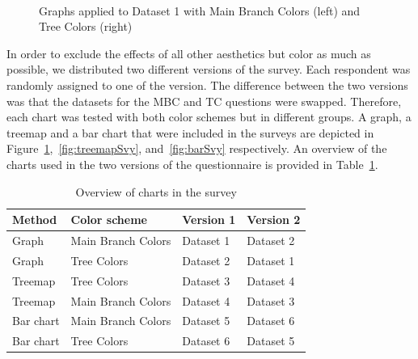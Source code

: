 \documentclass[journal]{vgtc}                %
\begin{document}
\begin{figure}[tb]
  \centering
  \mbox{
  }
  \caption{Graphs applied to Dataset 1 with Main Branch Colors (left) and Tree Colors (right)}\label{fig:graphSvy}

\end{figure}

In order to exclude the effects of all other aesthetics but color as much as possible, we distributed two different versions of the survey. Each respondent was randomly assigned to one of the version. The difference between the two versions was that the datasets for the MBC and TC questions were swapped. Therefore, each chart was tested with both color schemes but in different groups. A graph, a treemap and a bar chart that were included in the surveys are depicted in Figure~\ref{fig:graphSvy},~\ref{fig:treemapSvy}, and~\ref{fig:barSvy} respectively. An overview of the charts used in the two versions of the questionnaire is provided in Table~\ref{table:ques}.

\begin{table}[tb]
\begin{footnotesize}
\begin{tabular}{llll}
\toprule
Method & Color scheme & Version 1 & Version 2\\
\midrule
Graph & Main Branch Colors & Dataset 1 & Dataset 2\\
Graph & Tree Colors & Dataset 2 & Dataset 1\\
Treemap & Tree Colors & Dataset 3 & Dataset 4\\
Treemap & Main Branch Colors & Dataset 4 & Dataset 3\\
Bar chart & Main Branch Colors & Dataset 5 & Dataset 6\\
Bar chart & Tree Colors & Dataset 6 & Dataset 5\\
\bottomrule
\end{tabular}
\end{footnotesize}
\caption{Overview of charts in the survey}\label{table:ques}
\end{table}
\end{document}
